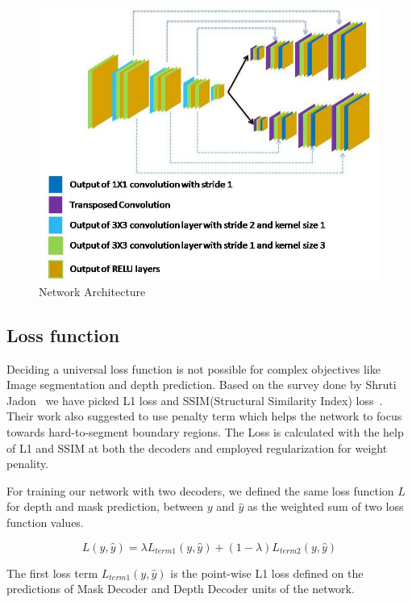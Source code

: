 \documentclass[review]{cvpr}
\begin{document}
\begin{figure}
\centering
  \includegraphics[width=1.0\linewidth]{networkarchitecture.jpg}
  \caption{Network Architecture}
  \label{fig:modelarch}
\end{figure}

\subsection{Loss function}
Deciding a universal loss function is not possible for complex objectives like Image segmentation and depth prediction. Based on the survey done by Shruti Jadon~\cite{jadon2020survey} we have picked L1 loss and SSIM(Structural Similarity Index) loss~\cite{zhao2015loss}. Their work also suggested to use penalty term which helps the network to focus towards hard-to-segment boundary regions. The Loss is calculated with the help of L1 and SSIM at both the decoders and employed regularization for weight penality.

For training our network with two decoders, we defined the same loss function $L$ for depth and mask prediction, between $y$ and $\hat{y}$ as the weighted sum of two loss function values.

\begin{equation}
L(y, \hat{y}) = \lambda L_{term1}(y, \hat{y}) + (1 - \lambda) L_{term2}(y, \hat{y})
\end{equation}

The first loss term $L_{term1}(y, \hat{y})$ is the point-wise L1 loss defined on the predictions of Mask Decoder and  Depth Decoder units of the network.
\end{document}

